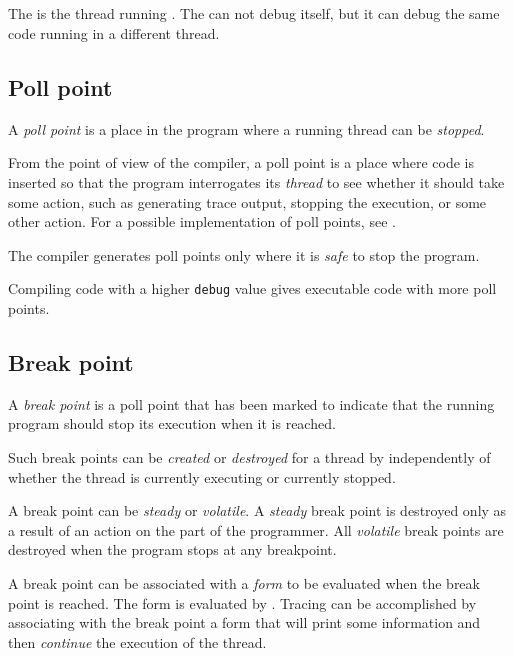 \subsection{\Debuggerthread{}}

The \debuggerthread{} is the thread running \sysname{}.  The
\debuggerthread{} can not debug itself, but it can debug the same code
running in a different thread.

%
\def\Pollpoint{Poll point}%
\def\pollpoint{poll point}%
\def\pollpoints{poll points}%
\subsection{\Pollpoint{}}

A \emph{\pollpoint{}} is a place in the program where a running thread
can be \emph{stopped}.

From the point of view of the compiler, a \pollpoint{} is a place
where code is inserted so that the program interrogates its
\emph{thread} to see whether it should take some action, such as
generating trace output, stopping the execution, or some other action.
For a possible implementation of poll points, see
.

The compiler generates \pollpoints{} only where it is \emph{safe} to
stop the program.

Compiling code with a higher \texttt{debug} value gives executable
code with more \pollpoints{}.

%
\def\Breakpoint{Break point}%
\def\breakpoint{break point}%
\def\breakpoints{break points}%
\subsection{\Breakpoint{}}

A \emph{\breakpoint{}} is a \pollpoint{} that has been marked to indicate
that the running program should stop its execution when it is
reached.

Such \breakpoints{} can be \emph{created} or \emph{destroyed} for a
thread by \sysname{} independently of whether the thread is currently
executing or currently stopped.

A \breakpoint{} can be \emph{steady} or \emph{volatile}.  A
\emph{steady} \breakpoint{} is destroyed only as a result of an action
on the part of the programmer.  All \emph{volatile} \breakpoints{} are
destroyed when the program stops at any breakpoint.

A \breakpoint{} can be associated with a \commonlisp{} \emph{form} to
be evaluated when the \breakpoint{} is reached.  The form is evaluated
by \sysname{}.  Tracing can be accomplished by associating with the
\breakpoint{} a form that will print some information and then
\emph{continue} the execution of the thread.

